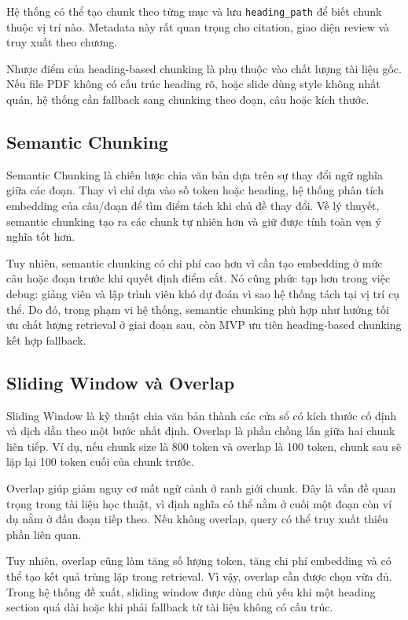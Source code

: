 Hệ thống có thể tạo chunk theo từng mục và lưu \texttt{heading\_path} để biết
chunk thuộc vị trí nào. Metadata này rất quan trọng cho citation, giao diện
review và truy xuất theo chương.

Nhược điểm của heading-based chunking là phụ thuộc vào chất lượng tài liệu gốc.
Nếu file PDF không có cấu trúc heading rõ, hoặc slide dùng style không nhất
quán, hệ thống cần fallback sang chunking theo đoạn, câu hoặc kích thước.

\subsection{Semantic Chunking}
\label{subsec:semantic-chunking}

Semantic Chunking là chiến lược chia văn bản dựa trên sự thay đổi ngữ nghĩa
giữa các đoạn. Thay vì chỉ dựa vào số token hoặc heading, hệ thống phân tích
embedding của câu/đoạn để tìm điểm tách khi chủ đề thay đổi. Về lý thuyết,
semantic chunking tạo ra các chunk tự nhiên hơn và giữ được tính toàn vẹn ý
nghĩa tốt hơn.

Tuy nhiên, semantic chunking có chi phí cao hơn vì cần tạo embedding ở mức câu
hoặc đoạn trước khi quyết định điểm cắt. Nó cũng phức tạp hơn trong việc debug:
giảng viên và lập trình viên khó dự đoán vì sao hệ thống tách tại vị trí cụ
thể. Do đó, trong phạm vi hệ thống, semantic chunking phù hợp như hướng tối ưu
chất lượng retrieval ở giai đoạn sau, còn MVP ưu tiên heading-based chunking
kết hợp fallback.

\subsection{Sliding Window và Overlap}
\label{subsec:sliding-window-overlap}

Sliding Window là kỹ thuật chia văn bản thành các cửa sổ có kích thước cố định
và dịch dần theo một bước nhất định. Overlap là phần chồng lấn giữa hai chunk
liên tiếp. Ví dụ, nếu chunk size là 800 token và overlap là 100 token, chunk
sau sẽ lặp lại 100 token cuối của chunk trước.

Overlap giúp giảm nguy cơ mất ngữ cảnh ở ranh giới chunk. Đây là vấn đề quan
trọng trong tài liệu học thuật, vì định nghĩa có thể nằm ở cuối một đoạn còn ví
dụ nằm ở đầu đoạn tiếp theo. Nếu không overlap, query có thể truy xuất thiếu
phần liên quan.

Tuy nhiên, overlap cũng làm tăng số lượng token, tăng chi phí embedding và có
thể tạo kết quả trùng lặp trong retrieval. Vì vậy, overlap cần được chọn vừa
đủ. Trong hệ thống đề xuất, sliding window được dùng chủ yếu khi một heading
section quá dài hoặc khi phải fallback từ tài liệu không có cấu trúc.

